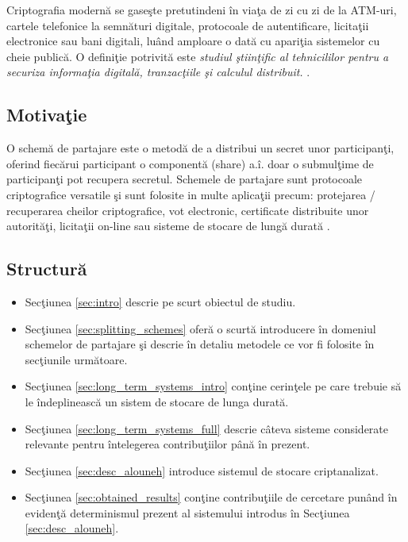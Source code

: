 \documentclass{llncs}
\begin{document}
Criptografia modern\u{a} se gase\c{s}te pretutindeni \^{i}n via\c{t}a de zi cu zi de la ATM-uri, cartele telefonice la semn\u{a}turi digitale, protocoale de autentificare, licita\c{t}ii electronice sau bani digitali, lu\^{a}nd amploare o dat\u{a} cu apari\c{t}ia sistemelor cu cheie public\u{a}. O defini\c{t}ie potrivit\u{a} este \textit{studiul \c{s}tiin\c{t}ific al tehnicililor pentru a securiza informa\c{t}ia digital\u{a}, tranzac\c{t}iile \c{s}i calculul distribuit.} \cite{Katz:2007}.

\subsection{Motiva\c{t}ie}

O schem\u{a} de partajare este o metod\u{a} de a distribui un secret unor participan\c{t}i, oferind fiec\u{a}rui participant o component\u{a} (share) a.\^{i}. doar o submul\c{t}ime de participan\c{t}i pot recupera secretul. Schemele de partajare sunt protocoale criptografice versatile \c{s}i sunt folosite in multe aplica\c{t}ii precum: protejarea / recuperarea cheilor criptografice, vot electronic, certificate distribuite unor autorit\u{a}\c{t}i, licita\c{t}ii on-line sau sisteme de stocare de lung\u{a} durat\u{a} \cite{Martin:2008}.


\subsection{Structur\u{a}}
\begin{itemize}
	\item Sec\c{t}iunea {\ref{sec:intro}} descrie pe scurt obiectul de studiu.
	\item Sec\c{t}iunea {\ref{sec:splitting_schemes}} ofer\u{a} o scurt\u{a} introducere \^{i}n domeniul schemelor de partajare \c{s}i descrie \^{i}n detaliu metodele ce vor fi folosite \^{i}n sec\c{t}iunile urm\u{a}toare.
	\item Sec\c{t}iunea {\ref{sec:long_term_systems_intro}} con\c{t}ine cerin\c{t}ele pe care trebuie s\u{a} le \^{i}ndeplineasc\u{a} un sistem de stocare de lunga durat\u{a}.
	\item Sec\c{t}iunea {\ref{sec:long_term_systems_full}} descrie c\^{a}teva sisteme considerate relevante pentru \^{i}ntelegerea contribu\c{t}iilor p\^{a}n\u{a} \^{i}n prezent.
	\item Sec\c{t}iunea {\ref{sec:desc_alouneh}} introduce sistemul de stocare criptanalizat.
	\item Sec\c{t}iunea {\ref{sec:obtained_results}} con\c{t}ine contribu\c{t}iile de cercetare pun\^{a}nd \^{i}n eviden\c{t}\u{a} determinismul prezent al sistemului introdus \^{i}n Sec\c{t}iunea {\ref{sec:desc_alouneh}}.
\end{itemize}
\end{document}
